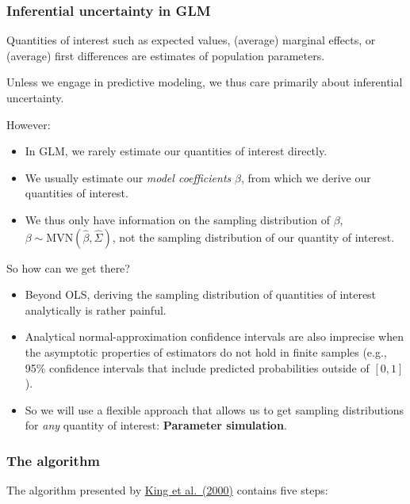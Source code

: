 \documentclass[
  11pt,
]{article}
\providecommand{\tightlist}{%
  \setlength{\itemsep}{0pt}\setlength{\parskip}{0pt}}
\begin{document}
\hypertarget{inferential-uncertainty-in-glm}{%
\subsubsection{Inferential uncertainty in GLM}\label{inferential-uncertainty-in-glm}}

Quantities of interest such as expected values, (average) marginal effects, or (average) first differences are estimates of population parameters.

Unless we engage in predictive modeling, we thus care primarily about inferential uncertainty.

However:

\begin{itemize}
\tightlist
\item
  In GLM, we rarely estimate our quantities of interest directly.
\item
  We usually estimate our \emph{model coefficients} \(\beta\), from which we derive our quantities of interest.
\item
  We thus only have information on the sampling distribution of \(\beta\), \(\beta \sim \text{MVN}(\hat\beta, \hat \Sigma)\), not the sampling distribution of our quantity of interest.
\end{itemize}

So how can we get there?

\begin{itemize}
\tightlist
\item
  Beyond OLS, deriving the sampling distribution of quantities of interest analytically is rather painful.
\item
  Analytical normal-approximation confidence intervals are also imprecise when the asymptotic properties of estimators do not hold in finite samples (e.g., 95\% confidence intervals that include predicted probabilities outside of \([0, 1]\)).
\item
  So we will use a flexible approach that allows us to get sampling distributions for \emph{any} quantity of interest: \textbf{Parameter simulation}.
\end{itemize}

\hypertarget{the-algorithm}{%
\subsubsection{The algorithm}\label{the-algorithm}}

The algorithm presented by \href{https://gking.harvard.edu/files/gking/files/making.pdf}{King et al.~(2000)} contains five steps:
\end{document}
